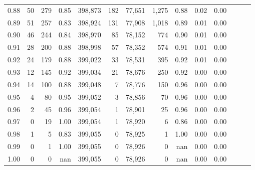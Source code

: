 \begin{tabular}{rrrrrrrrrrrrrr}
0.88 &      50 &    279 &  0.85 &  398,873 &      182 &  77,651 &   1,275 &  0.88 &  0.02 &      0.00 \\
0.89 &      51 &    257 &  0.83 &  398,924 &      131 &  77,908 &   1,018 &  0.89 &  0.01 &      0.00 \\
0.90 &      46 &    244 &  0.84 &  398,970 &       85 &  78,152 &     774 &  0.90 &  0.01 &      0.00 \\
0.91 &      28 &    200 &  0.88 &  398,998 &       57 &  78,352 &     574 &  0.91 &  0.01 &      0.00 \\
0.92 &      24 &    179 &  0.88 &  399,022 &       33 &  78,531 &     395 &  0.92 &  0.01 &      0.00 \\
0.93 &      12 &    145 &  0.92 &  399,034 &       21 &  78,676 &     250 &  0.92 &  0.00 &      0.00 \\
0.94 &      14 &    100 &  0.88 &  399,048 &        7 &  78,776 &     150 &  0.96 &  0.00 &      0.00 \\
0.95 &       4 &     80 &  0.95 &  399,052 &        3 &  78,856 &      70 &  0.96 &  0.00 &      0.00 \\
0.96 &       2 &     45 &  0.96 &  399,054 &        1 &  78,901 &      25 &  0.96 &  0.00 &      0.00 \\
0.97 &       0 &     19 &  1.00 &  399,054 &        1 &  78,920 &       6 &  0.86 &  0.00 &      0.00 \\
0.98 &       1 &      5 &  0.83 &  399,055 &        0 &  78,925 &       1 &  1.00 &  0.00 &      0.00 \\
0.99 &       0 &      1 &  1.00 &  399,055 &        0 &  78,926 &       0 &   nan &  0.00 &      0.00 \\
1.00 &       0 &      0 &   nan &  399,055 &        0 &  78,926 &       0 &   nan &  0.00 &      0.00 \\
\bottomrule
\end{tabular}
